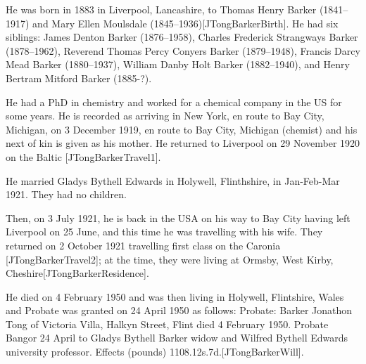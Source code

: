 
He was born in 1883 in Liverpool, Lancashire, to Thomas Henry Barker (1841--1917) and Mary Ellen Moulsdale (1845--1936)[JTongBarkerBirth]. He had six siblings:  James Denton Barker (1876--1958), Charles Frederick Strangways Barker (1878--1962),  Reverend Thomas Percy Conyers Barker (1879--1948), Francis Darcy Mead Barker (1880--1937), William Danby Holt Barker (1882--1940), and Henry Bertram Mitford Barker (1885-?). 

He had a PhD in chemistry and worked for a chemical company in the US for some years. He is recorded as arriving in New York, en route to Bay City, Michigan, on 3 December 1919, en route to Bay City, Michigan (chemist) and his next of kin is given as his mother. He returned to Liverpool on 29 November 1920 on the Baltic [JTongBarkerTravel1]. 

He married Gladys Bythell Edwards in Holywell, Flinthshire, in Jan-Feb-Mar 1921. They had  no children.

 Then, on 3 July 1921, he is back in the USA on his way to Bay City having left Liverpool on 25 June, and this time he was travelling with his wife. They returned on 2 October 1921 travelling first class on the Caronia [JTongBarkerTravel2];  at the time,  they were living at Ormsby, West Kirby, Cheshire[JTongBarkerResidence]. 

He died on 4 February 1950 and was then living in Holywell, Flintshire, Wales and Probate was granted  on 24 April 1950 as follows:   Probate: Barker Jonathon Tong of Victoria Villa, Halkyn Street, Flint died 4 February 1950. Probate Bangor 24 April to Gladys Bythell Barker widow and Wilfred Bythell Edwards university professor. Effects (pounds) 1108.12s.7d.[JTongBarkerWill].


